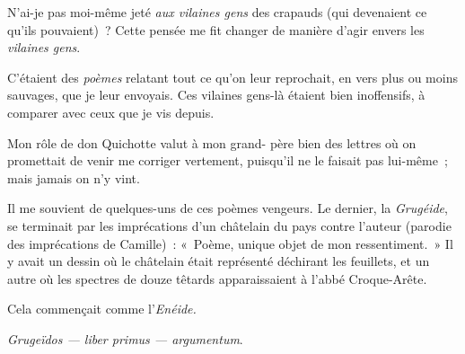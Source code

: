 \documentclass[french,twoside]{book} %
\newenvironment{quoteblock}%
  {\begin{quoting}}
  {\end{quoting}}
\newenvironment{quotebar}{%
    \def\FrameCommand{{\color{rubric!10!}\vrule width 0.5em} \hspace{0.9em}}%
    \def\OuterFrameSep{\itemsep} %
    \MakeFramed {\advance\hsize-\width \FrameRestore}
  }%
  {%
    \endMakeFramed
  }
\renewenvironment{quoteblock}%
  {%
    \savenotes
    \setstretch{0.9}
    \normalfont
    \begin{quotebar}
  }
  {%
    \end{quotebar}
    \spewnotes
  }
\begin{document}
N’ai-je pas moi-même jeté \emph{aux vilaines gens} des crapauds (qui devenaient ce qu’ils pouvaient) ? Cette pensée me fit changer de manière d’agir envers les \emph{vilaines gens}.\par
C’étaient des \emph{poèmes} relatant tout ce qu’on leur reprochait, en vers plus ou moins sauvages, que je leur envoyais. Ces vilaines gens-là étaient bien inoffensifs, à comparer avec ceux que je vis depuis.\par
Mon rôle de don Quichotte valut à mon grand- père bien des lettres où on promettait de venir me corriger vertement, puisqu’il ne le faisait pas lui-même ; mais jamais on n’y vint.\par
Il me souvient de quelques-uns de ces poèmes vengeurs. Le dernier, la \emph{Grugéide}, se terminait par les imprécations d’un châtelain du pays contre l’auteur (parodie des imprécations de Camille) : « Poème, unique objet de mon ressentiment. » Il y avait un dessin où le châtelain était représenté déchirant les feuillets, et un autre où les spectres de douze têtards apparaissaient à l’abbé Croque-Arête.\par
Cela commençait comme l’\emph{Enéide.}\par

\begin{quoteblock}
 \noindent \emph{Grugeïdos — liber primus — argumentum}.
 \end{quoteblock}
\end{document}
